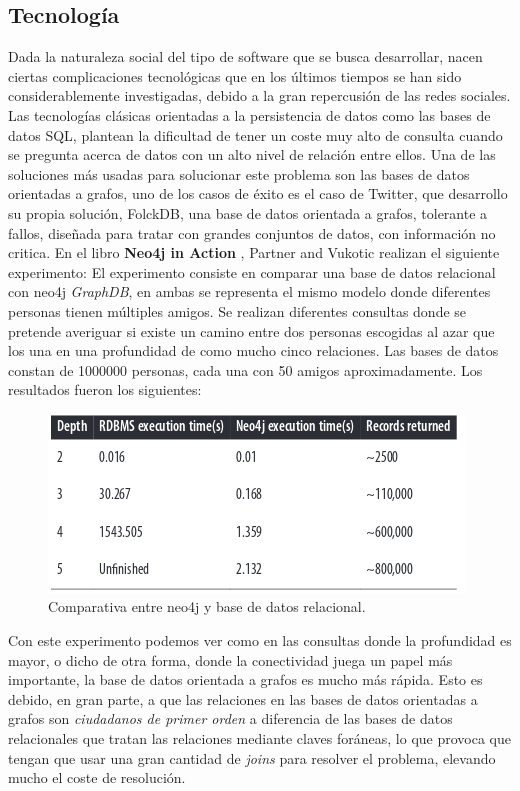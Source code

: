 \documentclass[12pt]{article} %
\begin{document}
\subsection{Tecnología}
Dada la naturaleza social del tipo de software que se busca desarrollar, nacen ciertas complicaciones tecnológicas que en los últimos tiempos se han sido considerablemente investigadas, debido a la gran repercusión de las redes sociales. Las tecnologías clásicas orientadas a la persistencia de datos como las bases de datos SQL, plantean la dificultad de tener un coste muy alto de consulta cuando se pregunta acerca de datos  con un alto nivel de relación entre ellos. Una de las soluciones más usadas para solucionar este problema son las bases de datos orientadas a grafos, uno de los casos de éxito es el caso de Twitter, que desarrollo su propia solución, FolckDB, una base de datos orientada a grafos, tolerante a fallos, diseñada para tratar con grandes conjuntos de datos, con información no critica.\newline
En el libro \textbf{Neo4j in Action} \cite{neo4jinaction}, Partner and Vukotic realizan el siguiente experimento: \newline
El experimento consiste en comparar una base de datos relacional con neo4j \textit{GraphDB}, en ambas se representa el mismo modelo donde diferentes personas tienen múltiples amigos. Se realizan diferentes consultas donde se pretende averiguar si existe un camino entre dos personas escogidas al azar que los una en una profundidad de como mucho cinco relaciones. Las bases de datos constan de 1000000 personas, cada una con 50 amigos aproximadamente. Los resultados fueron los siguientes:

\begin{figure}[ht!]
\center
\includegraphics[scale=0.5]{table_find_friends_experiment.png}
\caption{Comparativa entre neo4j y base de datos relacional.}
\label{fig:compa}
\end{figure}

Con este experimento podemos ver como en las consultas donde la profundidad es mayor, o dicho de otra forma, donde la conectividad juega un papel más importante, la base de datos orientada a grafos es mucho más rápida. Esto es debido, en gran parte, a que las relaciones en las bases de datos orientadas a grafos son \textit{ciudadanos de primer orden} a diferencia de las bases de datos relacionales que tratan las relaciones mediante claves foráneas, lo que provoca que tengan que usar una gran cantidad de \textit{joins} para resolver el problema, elevando mucho el coste de resolución.
\end{document}
